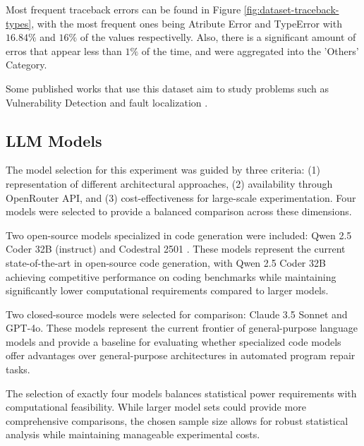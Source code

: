 Most frequent traceback errors can be found in Figure \ref{fig:dataset-traceback-types}, with the most frequent ones being Atribute Error and TypeError with $16.84\%$ and $16\%$ of the values respectivelly. Also, there is a significant amount of erros that appear less than $1\%$ of the time, and were aggregated into the 'Others' Category.

Some published works that use this dataset aim to study problems such as Vulnerability Detection \cite{zhao2024coding} and fault localization \cite{kulkarni2024graph}.

\subsection{LLM Models}
The model selection for this experiment was guided by three criteria: (1) representation of different architectural approaches, (2) availability through OpenRouter API, and (3) cost-effectiveness for large-scale experimentation. Four models were selected to provide a balanced comparison across these dimensions.

Two open-source models specialized in code generation were included: Qwen 2.5 Coder 32B (instruct) \cite{hui2024qwen25codertechnicalreport} and Codestral 2501 \cite{Codestral_202501}. These models represent the current state-of-the-art in open-source code generation, with Qwen 2.5 Coder 32B achieving competitive performance on coding benchmarks while maintaining significantly lower computational requirements compared to larger models.

Two closed-source models were selected for comparison: Claude 3.5 Sonnet and GPT-4o. These models represent the current frontier of general-purpose language models and provide a baseline for evaluating whether specialized code models offer advantages over general-purpose architectures in automated program repair tasks.

The selection of exactly four models balances statistical power requirements with computational feasibility. While larger model sets could provide more comprehensive comparisons, the chosen sample size allows for robust statistical analysis while maintaining manageable experimental costs.



